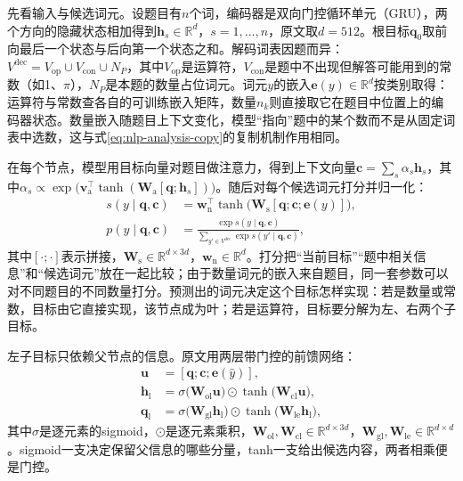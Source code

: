 先看输入与候选词元。设题目有$n$个词，编码器是双向门控循环单元（GRU），两个方向的隐藏状态相加得到$\bm{h}_s\in\mathbb{R}^{d}$，$s=1,\ldots,n$，原文取$d=512$。根目标$\bm{q}_0$取前向最后一个状态与后向第一个状态之和。解码词表因题而异：$V^{\mathrm{dec}}=V_{\mathrm{op}}\cup V_{\mathrm{con}}\cup N_P$，其中$V_{\mathrm{op}}$是运算符，$V_{\mathrm{con}}$是题中不出现但解答可能用到的常数（如1、$\pi$），$N_P$是本题的数量占位词元。词元$y$的嵌入$\bm{e}(y)\in\mathbb{R}^{d}$按类别取得：运算符与常数查各自的可训练嵌入矩阵，数量$n_k$则直接取它在题目中位置上的编码器状态。数量嵌入随题目上下文变化，模型“指向”题中的某个数而不是从固定词表中选数，这与式\eqref{eq:nlp-analysis-copy}的复制机制作用相同。

在每个节点，模型用目标向量对题目做注意力，得到上下文向量$\bm{c}=\sum_s\alpha_s\bm{h}_s$，其中$\alpha_s\propto\exp\bigl(\bm{v}_{\mathrm{a}}^{\top}\tanh(\bm{W}_{\mathrm{a}}[\bm{q};\bm{h}_s])\bigr)$。随后对每个候选词元打分并归一化：
\begin{equation}
  \begin{aligned}
  s(y\mid\bm{q},\bm{c})&=\bm{w}_{\mathrm{n}}^{\top}\tanh\bigl(\bm{W}_{\mathrm{s}}[\bm{q};\bm{c};\bm{e}(y)]\bigr),\\
  p(y\mid\bm{q},\bm{c})&=\frac{\exp s(y\mid\bm{q},\bm{c})}{\sum_{y'\in V^{\mathrm{dec}}}\exp s(y'\mid\bm{q},\bm{c})},
  \end{aligned}
  \label{eq:nlp-execution-gts-score}
\end{equation}
其中$[\cdot;\cdot]$表示拼接，$\bm{W}_{\mathrm{s}}\in\mathbb{R}^{d\times3d}$，$\bm{w}_{\mathrm{n}}\in\mathbb{R}^{d}$。打分把“当前目标”“题中相关信息”和“候选词元”放在一起比较；由于数量词元的嵌入来自题目，同一套参数可以对不同题目的不同数量打分。预测出的词元决定这个目标怎样实现：若是数量或常数，目标由它直接实现，该节点成为叶；若是运算符，目标要分解为左、右两个子目标。

左子目标只依赖父节点的信息。原文用两层带门控的前馈网络：
\begin{equation}
  \begin{aligned}
  \bm{u}&=[\bm{q};\bm{c};\bm{e}(\hat y)],\\
  \bm{h}_{\mathrm{l}}&=\sigma\bigl(\bm{W}_{\mathrm{ol}}\bm{u}\bigr)\odot\tanh\bigl(\bm{W}_{\mathrm{cl}}\bm{u}\bigr),\\
  \bm{q}_{\mathrm{l}}&=\sigma\bigl(\bm{W}_{\mathrm{gl}}\bm{h}_{\mathrm{l}}\bigr)\odot\tanh\bigl(\bm{W}_{\mathrm{le}}\bm{h}_{\mathrm{l}}\bigr),
  \end{aligned}
  \label{eq:nlp-execution-gts-left}
\end{equation}
其中$\sigma$是逐元素的sigmoid，$\odot$是逐元素乘积，$\bm{W}_{\mathrm{ol}},\bm{W}_{\mathrm{cl}}\in\mathbb{R}^{d\times3d}$，$\bm{W}_{\mathrm{gl}},\bm{W}_{\mathrm{le}}\in\mathbb{R}^{d\times d}$。sigmoid一支决定保留父信息的哪些分量，tanh一支给出候选内容，两者相乘便是门控。

